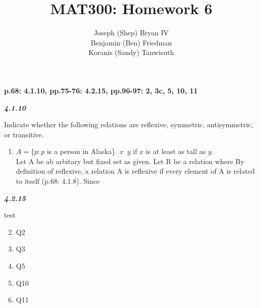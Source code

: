 \documentclass{article}
\begin{document}
\title{MAT300: Homework 6}
\author{
	Joseph (Shep) Bryan IV \\
	Benjamin (Ben) Friedman\\
	Koranis (Sandy) Tanwisuth
}

\maketitle
	\begin{flushleft}
		\textbf{p.68: 4.1.10, pp.75-76: 4.2.15, pp.96-97: 2, 3c, 5, 10, 11}

		\textbf{\textit{4.1.10}}
		\begin{flushleft}
			Indicate whether the following relations are reflexive, symmetric, antisymmetric, or transitive.
			\begin{enumerate}
				\item $A = \{p: p$ is a person in Alaska\}. $x$~$y$ if $x$ is at least as tall as $y$.
				\\
				Let A be ab arbitary but fixed set as given. Let R be a relation where By definition of reflexive, a relation A is reflexive if every element of A is related to itself (p.68: 4.1.8).  Since 
				
			\end{enumerate}
		\end{flushleft}
		
		\textbf{\textit{4.2.15}}
		\begin{flushleft}
			test
		\end{flushleft}
		\begin{enumerate}
			\setcounter{enumi}{1}
			\item Q2
		
			\item Q3
		
			\setcounter{enumi}{4}
			\item Q5
		
			\setcounter{enumi}{9}
			\item Q10
		
			\item Q11
	
		\end{enumerate}
	\end{flushleft}
\end{document}
